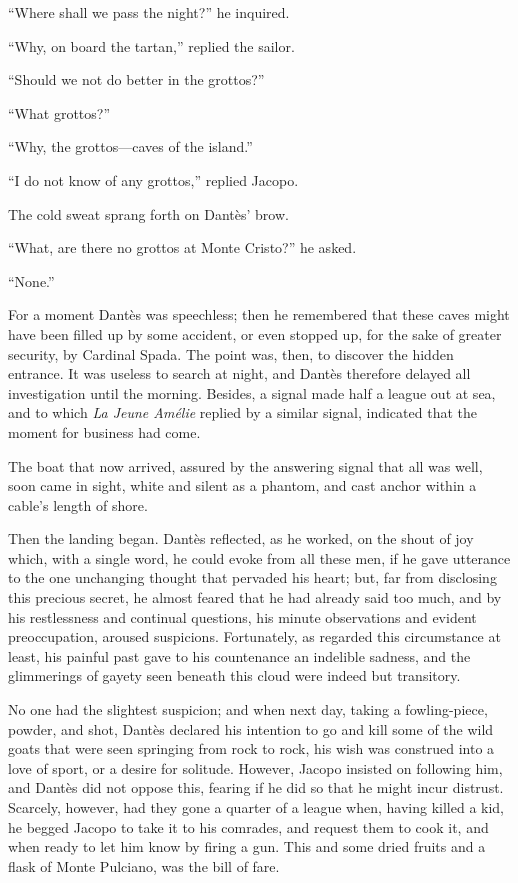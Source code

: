 “Where shall we pass the night?” he inquired.

“Why, on board the tartan,” replied the sailor.

“Should we not do better in the grottos?”

“What grottos?”

“Why, the grottos—caves of the island.”

“I do not know of any grottos,” replied Jacopo.

The cold sweat sprang forth on Dantès’ brow.

“What, are there no grottos at Monte Cristo?” he asked.

“None.”

For a moment Dantès was speechless; then he remembered that these caves
might have been filled up by some accident, or even stopped up, for the
sake of greater security, by Cardinal Spada. The point was, then, to
discover the hidden entrance. It was useless to search at night, and
Dantès therefore delayed all investigation until the morning. Besides,
a signal made half a league out at sea, and to which \textit{La Jeune Amélie}
replied by a similar signal, indicated that the moment for business had
come.

The boat that now arrived, assured by the answering signal that all was
well, soon came in sight, white and silent as a phantom, and cast
anchor within a cable’s length of shore.

Then the landing began. Dantès reflected, as he worked, on the shout of
joy which, with a single word, he could evoke from all these men, if he
gave utterance to the one unchanging thought that pervaded his heart;
but, far from disclosing this precious secret, he almost feared that he
had already said too much, and by his restlessness and continual
questions, his minute observations and evident preoccupation, aroused
suspicions. Fortunately, as regarded this circumstance at least, his
painful past gave to his countenance an indelible sadness, and the
glimmerings of gayety seen beneath this cloud were indeed but
transitory.

No one had the slightest suspicion; and when next day, taking a
fowling-piece, powder, and shot, Dantès declared his intention to go
and kill some of the wild goats that were seen springing from rock to
rock, his wish was construed into a love of sport, or a desire for
solitude. However, Jacopo insisted on following him, and Dantès did not
oppose this, fearing if he did so that he might incur distrust.
Scarcely, however, had they gone a quarter of a league when, having
killed a kid, he begged Jacopo to take it to his comrades, and request
them to cook it, and when ready to let him know by firing a gun. This
and some dried fruits and a flask of Monte Pulciano, was the bill of
fare.

